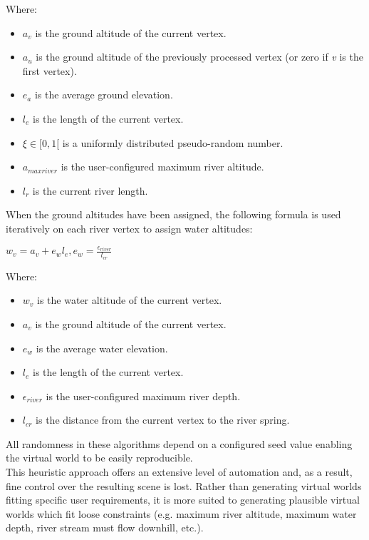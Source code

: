 Where:
\begin{itemize}
\item $a_{v}$ is the ground altitude of the current vertex.
\item $a_{u}$ is the ground altitude of the previously processed vertex (or zero if \textit{v} is the first vertex).
\item $e_{a}$ is the average ground elevation.
\item $l_{e}$ is the length of the current vertex.
\item $\xi \in [0,1[$ is a uniformly distributed pseudo-random number.
\item $a_{maxriver}$ is the user-configured maximum river altitude.
\item $l_{r}$ is the current river length.
\end{itemize}

When the ground altitudes have been assigned, the following formula is used iteratively on each river vertex to assign water altitudes:

\begin{center}
$w_{v} = a_{v} + e_{w}l_{e}, e_{w} = \frac{\epsilon_{river}}{l_{cr}} $
\end{center}

Where:
\begin{itemize}
\item $w_{v}$ is the water altitude of the current vertex.
\item $a_{v}$ is the ground altitude of the current vertex.
\item $e_{w}$ is the average water elevation.
\item $l_{e}$ is the length of the current vertex.
\item $\epsilon_{river}$ is the user-configured maximum river depth.
\item $l_{cr}$ is the distance from the current vertex to the river spring.
\end{itemize}

All randomness in these algorithms depend on a configured seed value enabling the virtual world to be easily reproducible.  \\

This heuristic approach offers an extensive level of automation and, as a result, fine control over the resulting scene is lost. Rather than generating virtual worlds fitting specific user requirements, it is more suited to generating plausible virtual worlds which fit loose constraints (e.g. maximum river altitude, maximum water depth, river stream must flow downhill, etc.). 

